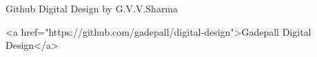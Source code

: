 Github Digital Design by G.V.V.Sharma

<a href="https://github.com/gadepall/digital-design">Gadepall Digital Design</a>
